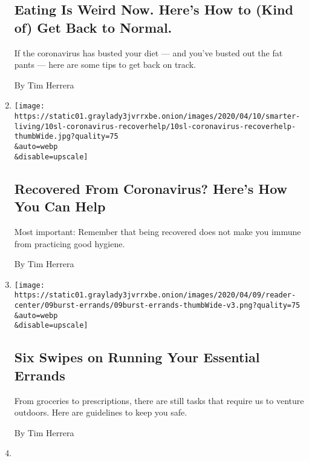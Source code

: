 \begin{enumerate}
{  \subsection{Eating Is Weird Now. Here's How to (Kind of) Get Back to
  Normal.}\label{eating-is-weird-now-heres-how-to-kind-of-get-back-to-normal}}

  If the coronavirus has busted your diet --- and you've busted out the
  fat pants --- here are some tips to get back on track.

  By Tim Herrera
\item
  \href{/2020/04/12/smarter-living/coronavirus-recovered-how-to-help.html}{}

  \texttt{[image: https://static01.graylady3jvrrxbe.onion/images/2020/04/10/smarter-living/10sl-coronavirus-recoverhelp/10sl-coronavirus-recoverhelp-thumbWide.jpg?quality=75\\\&auto=webp\\\&disable=upscale]}

  \hypertarget{recovered-from-coronavirus-heres-how-you-can-help}{%
  \subsection{Recovered From Coronavirus? Here's How You Can
  Help}\label{recovered-from-coronavirus-heres-how-you-can-help}}

  Most important: Remember that being recovered does not make you immune
  from practicing good hygiene.

  By Tim Herrera
\item
  \href{/interactive/2020/04/10/burst/coronavirus-shopping-exercise-delivery.html}{}

  \texttt{[image: https://static01.graylady3jvrrxbe.onion/images/2020/04/09/reader-center/09burst-errands/09burst-errands-thumbWide-v3.png?quality=75\\\&auto=webp\\\&disable=upscale]}

  \hypertarget{six-swipes-on-running-your-essential-errands}{%
  \subsection{Six Swipes on Running Your Essential
  Errands}\label{six-swipes-on-running-your-essential-errands}}

  From groceries to prescriptions, there are still tasks that require us
  to venture outdoors. Here are guidelines to keep you safe.

  By Tim Herrera
\item
  \href{/2020/03/23/smarter-living/9-delightful-articles-to-help-you-get-through-this-week.html}{}


\end{enumerate}
